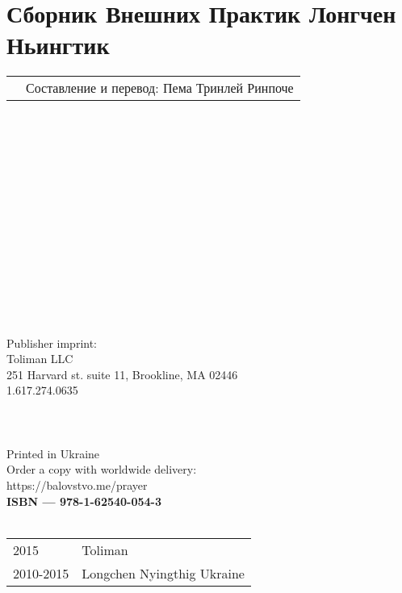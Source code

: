 \section*{Сборник Внешних Практик Лонгчен Ньингтик}

\begin{tabular}{ll}
& Составление и перевод: Пема Тринлей Ринпоче\\
\end{tabular}
\\
\\
\\
\\
\\
\\
\\
\\
\\
\\
\\
\\
\\
\\
Publisher imprint: \\
Toliman LLC \\
251 Harvard st. suite 11, Brookline, MA 02446 \\
1.617.274.0635 \\
\\
\\
\\
Printed in Ukraine \\

Order a copy with worldwide delivery: \\
https://balovstvo.me/prayer \\

{\bf  ISBN — 978-1-62540-054-3 \hspace{2em}} \\ \\

\begin{tabular}{ll}
\textcopyright{} 2015 & Toliman \\
\textcopyright{} 2010-2015 & Longchen Nyingthig Ukraine
\end{tabular}
